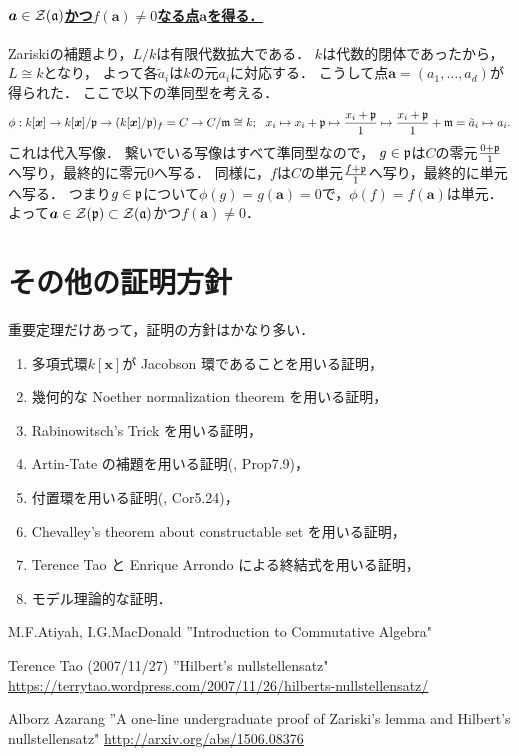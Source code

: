 \documentclass[lualatex, ja=standard, a4paper]{bxjsarticle}
\newcommand{\step}[1]{\paragraph{\underline{#1}}}
\newcommand{\xz}{\boldsymbol{x}}
\newcommand{\az}{\boldsymbol{a}}
\begin{document}
    \step{$\az \in \zeros(\I{a})$かつ$f(\az) \neq 0$なる点$\az$を得る．}
    Zariskiの補題より，$L/k$は有限代数拡大である．
    $k$は代数的閉体であったから，$L \cong k$となり，
    よって各$\tilde{a}_i$は$k$の元$a_i$に対応する．
    こうして点$\az=(a_1,\dots,a_d)$が得られた．
    ここで以下の準同型を考える．
    \[
        \phi: k[\xz] \to k[\xz]/\I{p} \to (k[\xz]/\I{p})_f=C \to C/\I{m} \cong k;
    ~~ x_i \mapsto x_i+\I{p} \mapsto \frac{x_i+\I{p}}{1} \mapsto \frac{x_i+\I{p}}{1}+\I{m}=\tilde{a}_i \mapsto a_i.
    \]
    これは代入写像．
    繋いでいる写像はすべて準同型なので，
    $g \in \mathfrak{p}$は$C$の零元$\frac{0+\mathfrak{p}}{1}$へ写り，最終的に零元$0$へ写る．
    同様に，$f$は$C$の単元$\frac{f+\mathfrak{p}}{1}$へ写り，最終的に単元へ写る．
    つまり$g \in \mathfrak{p}$について$\phi(g)=g(\az)=0$で，$\phi(f)=f(\az)$は単元．
    よって$\az \in \zeros(\I{p}) \subset \zeros(\I{a})$かつ$f(\az) \neq 0$．

\section{その他の証明方針}
    重要定理だけあって，証明の方針はかなり多い．
    \begin{enumerate}
        \item 多項式環$k[\xz]$が Jacobson 環であることを用いる証明，
        \item 幾何的な Noether normalization theorem を用いる証明，
        \item Rabinowitsch's Trick を用いる証明，
        \item Artin-Tate の補題を用いる証明(\cite{atimac}, Prop7.9)，
        \item 付置環を用いる証明(\cite{atimac}, Cor5.24)，
        \item Chevalley's theorem about constructable set を用いる証明，
        \item Terence Tao と Enrique Arrondo による終結式を用いる証明，
        \item モデル理論的な証明．
    \end{enumerate}

\begin{thebibliography}{9}
        M.F.Atiyah, I.G.MacDonald
        ''Introduction to Commutative Algebra"

        Terence Tao (2007/11/27)
        ''Hilbert’s nullstellensatz"
        \url{https://terrytao.wordpress.com/2007/11/26/hilberts-nullstellensatz/}

        Alborz Azarang
        ''A one-line undergraduate proof of Zariski's lemma and Hilbert's nullstellensatz"
        \url{http://arxiv.org/abs/1506.08376}
\end{thebibliography}
\end{document}
